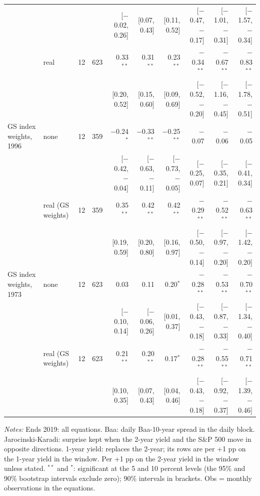 \begin{table}[tp]
{\begin{tabular}{llcrrrrrrr}
 & & & & {\scriptsize [$-$0.02, 0.26]} & {\scriptsize [0.07, 0.43]} & {\scriptsize [0.11, 0.52]} & {\scriptsize [$-$0.47, $-$0.17]} & {\scriptsize [$-$1.01, $-$0.31]} & {\scriptsize [$-$1.57, $-$0.34]}\\
 & real & 12 & 623 & 0.33$^{**}$ & 0.31$^{**}$ & 0.23$^{**}$ & $-$0.34$^{**}$ & $-$0.67$^{**}$ & $-$0.83$^{**}$\\
 & & & & {\scriptsize [0.20, 0.52]} & {\scriptsize [0.15, 0.60]} & {\scriptsize [0.09, 0.69]} & {\scriptsize [$-$0.52, $-$0.20]} & {\scriptsize [$-$1.16, $-$0.45]} & {\scriptsize [$-$1.78, $-$0.51]}\\
\addlinespace
GS index weights, 1996 & none & 12 & 359 & $-$0.24$^{*}$ & $-$0.33$^{**}$ & $-$0.25$^{**}$ & $-$0.07 & $-$0.06 & $-$0.05\\
 & & & & {\scriptsize [$-$0.42, $-$0.04]} & {\scriptsize [$-$0.63, $-$0.11]} & {\scriptsize [$-$0.73, $-$0.05]} & {\scriptsize [$-$0.25, 0.07]} & {\scriptsize [$-$0.35, 0.21]} & {\scriptsize [$-$0.41, 0.34]}\\
 & real (GS weights) & 12 & 359 & 0.35$^{**}$ & 0.42$^{**}$ & 0.42$^{**}$ & $-$0.29$^{**}$ & $-$0.52$^{**}$ & $-$0.63$^{**}$\\
 & & & & {\scriptsize [0.19, 0.59]} & {\scriptsize [0.20, 0.80]} & {\scriptsize [0.16, 0.97]} & {\scriptsize [$-$0.50, $-$0.14]} & {\scriptsize [$-$0.97, $-$0.20]} & {\scriptsize [$-$1.42, $-$0.20]}\\
\addlinespace
GS index weights, 1973 & none & 12 & 623 & 0.03 & 0.11 & 0.20$^{*}$ & $-$0.28$^{**}$ & $-$0.53$^{**}$ & $-$0.70$^{**}$\\
 & & & & {\scriptsize [$-$0.10, 0.14]} & {\scriptsize [$-$0.06, 0.26]} & {\scriptsize [0.01, 0.37]} & {\scriptsize [$-$0.43, $-$0.18]} & {\scriptsize [$-$0.87, $-$0.33]} & {\scriptsize [$-$1.34, $-$0.40]}\\
 & real (GS weights) & 12 & 623 & 0.21$^{**}$ & 0.20$^{**}$ & 0.17$^{*}$ & $-$0.28$^{**}$ & $-$0.55$^{**}$ & $-$0.71$^{**}$\\
 & & & & {\scriptsize [0.10, 0.35]} & {\scriptsize [0.07, 0.43]} & {\scriptsize [0.04, 0.46]} & {\scriptsize [$-$0.43, $-$0.18]} & {\scriptsize [$-$0.92, $-$0.37]} & {\scriptsize [$-$1.39, $-$0.46]}\\
\bottomrule\end{tabular}}
\begin{flushleft}\footnotesize\textit{Notes:} Ends 2019: all equations. Baa: daily Baa-10-year spread in the daily block. Jarocinski-Karadi: surprise kept when the 2-year yield and the S\&P 500 move in opposite directions. 1-year yield: replaces the 2-year; its rows are per +1 pp on the 1-year yield in the window. Per +1 pp on the 2-year yield in the window unless stated. $^{**}$ and $^{*}$: significant at the 5 and 10 percent levels (the 95\% and 90\% bootstrap intervals exclude zero); 90\% intervals in brackets. Obs = monthly observations in the equations.\end{flushleft}
\end{table}

